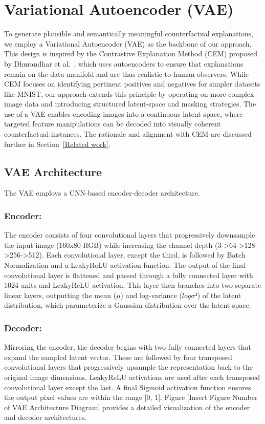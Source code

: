 \section{Variational Autoencoder (VAE)} \label{Section Variational Autoencoder (VAE)}
To generate plausible and semantically meaningful counterfactual explanations, we employ a Variational Autoencoder (VAE) as the backbone of our approach. This design is inspired by the Contrastive Explanation Method (CEM) proposed by Dhurandhar et al.~\cite{DBLP:journals/corr/abs-1802-07623}, which uses autoencoders to ensure that explanations remain on the data manifold and are thus realistic to human observers. While CEM focuses on identifying pertinent positives and negatives for simpler datasets like MNIST, our approach extends this principle by operating on more complex image data and introducing structured latent-space and masking strategies. The use of a VAE enables encoding images into a continuous latent space, where targeted feature manipulations can be decoded into visually coherent counterfactual instances. The rationale and alignment with CEM are discussed further in Section~\ref{Related work}.

\subsection{VAE Architecture}  \label{sec: vae_archeticture}

The VAE employs a CNN-based encoder-decoder architecture.
\subsubsection{Encoder: } The encoder consists of four convolutional layers that progressively downsample the input image (160x80 RGB) while increasing the channel depth (3->64->128->256->512). Each convolutional layer, except the third, is followed by Batch Normalization and a LeakyReLU activation function. The output of the final convolutional layer is flattened and passed through a fully connected layer with 1024 units and LeakyReLU activation. This layer then branches into two separate linear layers, outputting the mean ($μ$) and log-variance ($log σ²$) of the latent distribution, which parameterize a Gaussian distribution over the latent space.

\subsubsection{Decoder: } Mirroring the encoder, the decoder begins with two fully connected layers that expand the sampled latent vector. These are followed by four transposed convolutional layers that progressively upsample the representation back to the original image dimensions. LeakyReLU activations are used after each transposed convolutional layer except the last. A final Sigmoid activation function ensures the output pixel values are within the range [0, 1]. Figure [Insert Figure Number of VAE Architecture Diagram] provides a detailed visualization of the encoder and decoder architectures.

